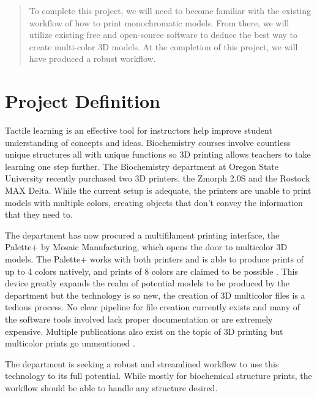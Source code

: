 \documentclass[letterpaper, onecolumn, draftclsnofoot, 10pt, compsoc]{IEEEtran}
\begin{document}
\begin{titlepage}
\begin{singlespace}
\begin{abstract}
            To complete this project, we will need to become familiar with the existing workflow of how to print monochromatic models. From there, we will utilize existing free and open-source software to deduce the best way to create multi-color 3D models. At the completion of this project, we will have produced a robust workflow.\par
        \end{abstract}     
    \end{singlespace}
\end{titlepage}
\newpage
{}
\tableofcontents
\clearpage

\section{Project Definition}
    \begin{singlespace}
        Tactile learning is an effective tool for instructors help improve student understanding of concepts and ideas. Biochemistry courses involve countless unique structures all with unique functions so 3D printing allows teachers to take learning one step further. The Biochemistry department at Oregon State University recently purchased two 3D printers, the Zmorph 2.0S and the Rostock MAX Delta. While the current setup is adequate, the printers are unable to print models with multiple colors, creating objects that don’t convey the information that they need to.\par
        The department has now procured a multifilament printing interface, the Palette+ by Mosaic Manufacturing, which opens the door to multicolor 3D models. The Palette+ works with both printers and is able to produce prints of up to 4 colors natively, and prints of 8 colors are claimed to be possible \cite{8colorprint}. This device greatly expands the realm of potential models to be produced by the department but the technology is so new, the creation of 3D multicolor files is a tedious process. No clear pipeline for file creation currently exists and many of the software tools involved lack proper documentation or are extremely expensive. Multiple publications also exist on the topic of 3D printing but multicolor prints go unmentioned \cite{progconv}.\par
        The department is seeking a robust and streamlined workflow to use this technology to its full potential. While mostly for biochemical structure prints, the workflow should be able to handle any structure desired.\par
    \end{singlespace}
\end{document}
